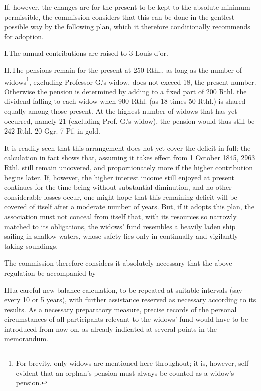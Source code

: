 \par{}
If, however, the changes are for the present to be kept to the absolute minimum permissible, the commission considers that this can be done in the gentlest possible way by the following plan, which it therefore conditionally recommends for adoption.

I.\quad The annual contributions are raised to 3 Louis d'or.

II.\quad The pensions remain for the present at 250 Rthl., as long as the number of widows\footnote{For brevity, only widows are mentioned here throughout; it is, however, self-evident that an orphan's pension must always be counted as a widow's pension.}, excluding Professor G.'s widow, does not exceed 18, the present number. Otherwise the pension is determined by adding to a fixed part of 200 Rthl. the dividend falling to each widow when 900 Rthl. (as 18 times 50 Rthl.) is shared equally among those present. At the highest number of widows that has yet occurred, namely 21 (excluding Prof. G.'s widow), the pension would thus still be 242 Rthl. 20 Ggr. 7 Pf. in gold.

It is readily seen that this arrangement does not yet cover the deficit in full: the calculation in fact shows that, assuming it takes effect from 1 October 1845, 2963 Rthl. still remain uncovered, and proportionately more if the higher contribution begins later. If, however, the higher interest income still enjoyed at present continues for the time being without substantial diminution, and no other considerable losses occur, one might hope that this remaining deficit will be covered of itself after a moderate number of years. But, if it adopts this plan, the association must not conceal from itself that, with its resources so narrowly matched to its obligations, the widows' fund resembles a heavily laden ship sailing in shallow waters, whose safety lies only in continually and vigilantly taking soundings.

The commission therefore considers it absolutely necessary that the above regulation be accompanied by

III.\quad a careful new balance calculation, to be repeated at suitable intervals (say every 10 or 5 years), with further assistance reserved as necessary according to its results. As a necessary preparatory measure, precise records of the personal circumstances of all participants relevant to the widows' fund would have to be introduced from now on, as already indicated at several points in the memorandum.

